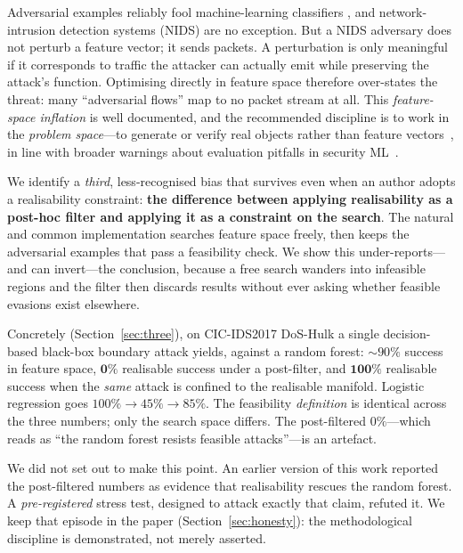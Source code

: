 \documentclass[10pt,twocolumn]{article}
\begin{document}
Adversarial examples reliably fool machine-learning classifiers
\cite{szegedy2014intriguing,goodfellow2015explaining}, and network-intrusion
detection systems (NIDS) are no exception. But a NIDS adversary does not perturb a
feature vector; it sends packets. A perturbation is only meaningful if it
corresponds to traffic the attacker can actually emit while preserving the
attack's function. Optimising directly in feature space therefore over-states the
threat: many ``adversarial flows'' map to no packet stream at all. This
\emph{feature-space inflation} is well documented, and the recommended discipline
is to work in the \emph{problem space}---to generate or verify real objects rather
than feature vectors~\cite{pierazzi2020problemspace,apruzzese2022realistic}, in
line with broader warnings about evaluation pitfalls in security
ML~\cite{arp2022dodo}.

We identify a \emph{third}, less-recognised bias that survives even when an author
adopts a realisability constraint: \textbf{the difference between applying
realisability as a post-hoc filter and applying it as a constraint on the search}.
The natural and common implementation searches feature space freely, then keeps
the adversarial examples that pass a feasibility check. We show this
under-reports---and can invert---the conclusion, because a free search wanders
into infeasible regions and the filter then discards results without ever asking
whether feasible evasions exist elsewhere.

Concretely (Section~\ref{sec:three}), on CIC-IDS2017 DoS-Hulk a single
decision-based black-box boundary attack yields, against a random forest:
$\sim$$90\%$ success in feature space, $\mathbf{0\%}$ realisable success under a
post-filter, and $\mathbf{100\%}$ realisable success when the \emph{same} attack
is confined to the realisable manifold. Logistic regression goes $100\%\!\to\!45\%\!\to\!85\%$.
The feasibility \emph{definition} is identical across the three numbers; only the
search space differs. The post-filtered $0\%$---which reads as ``the random forest
resists feasible attacks''---is an artefact.

We did not set out to make this point. An earlier version of this work reported
the post-filtered numbers as evidence that realisability rescues the random
forest. A \emph{pre-registered} stress test, designed to attack exactly that
claim, refuted it. We keep that episode in the paper (Section~\ref{sec:honesty}):
the methodological discipline is demonstrated, not merely asserted.
\end{document}
